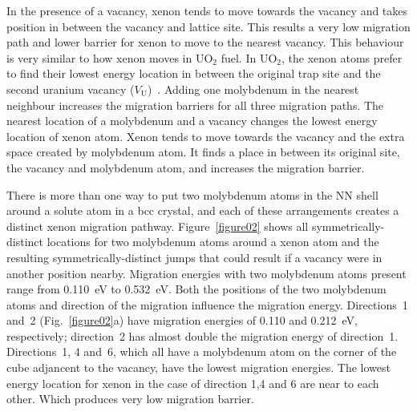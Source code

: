 In the presence of a vacancy, xenon tends to move towards the vacancy and takes position
in between the vacancy and lattice site. This results a very low migration path and lower
barrier for xenon to move to the nearest vacancy. %
This behaviour is very similar to how xenon moves in UO$_2$ fuel. In UO$_2$, the xenon atoms prefer to find their
lowest energy location in between the original trap site and the second uranium vacancy ($V_{\text{U}}$)~\cite{andersson2011u}. Adding one molybdenum in the nearest neighbour increases the migration barriers for all three migration paths. The nearest location of a molybdenum and a vacancy changes the lowest energy location of xenon atom. Xenon tends to move towards the vacancy and the extra space created by molybdenum atom. It finds a place in between its original site, the vacancy and molybdenum atom, and increases the migration barrier.

There is more than one way to put two molybdenum atoms in the
NN shell around a solute atom in a bcc crystal, and each of these arrangements
creates a distinct xenon migration pathway. Figure~\ref{figure02} shows all
symmetrically-distinct locations for two molybdenum atoms around a xenon atom
and the resulting symmetrically-distinct jumps that could result if a vacancy
were in another position nearby. Migration energies with two molybdenum atoms
present range from 0.110~eV to 0.532~eV\@. 
Both the positions of the two molybdenum atoms and direction of the migration
influence the migration energy.
Directions~1 and~2 (Fig.~\ref{figure02}a) have migration energies of 0.110
and 0.212~eV, respectively; direction~2 has almost double the migration energy
of direction~1.
Directions~1, 4 and~6, which all have a molybdenum atom on the corner of the
cube adjancent to the vacancy, have the lowest migration energies. The lowest energy
location for xenon in the case of direction 1,4 and 6 are near to each other. Which produces 
very low migration barrier. 


